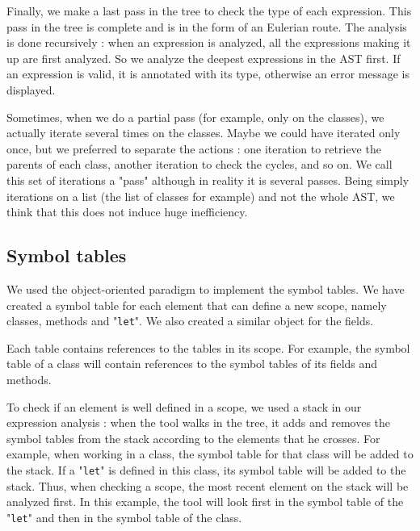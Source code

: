 \documentclass[a4paper, 12pt]{article}
\begin{document}
    Finally, we make a last pass in the tree to check the type of each expression. This pass in the tree is complete and is in the form of an Eulerian route. The analysis is done recursively : when an expression is analyzed, all the expressions making it up are first analyzed. So we analyze the deepest expressions in the AST first. If an expression is valid, it is annotated with its type, otherwise an error message is displayed.
    
    \begin{rmk}
        Sometimes, when we do a partial pass (for example, only on the classes), we actually iterate several times on the classes. Maybe we could have iterated only once, but we preferred to separate the actions : one iteration to retrieve the parents of each class, another iteration to check the cycles, and so on. We call this set of iterations a "pass" although in reality it is several passes. Being simply iterations on a list (the list of classes for example) and not the whole AST, we think that this does not induce huge inefficiency.
    \end{rmk}
    
    \subsection{Symbol tables}
    
    We used the object-oriented paradigm to implement the symbol tables. We have created a symbol table for each element that can define a new scope, namely classes, methods and "\texttt{let}". We also created a similar object for the fields.
    
    Each table contains references to the tables in its scope. For example, the symbol table of a class will contain references to the symbol tables of its fields and methods.
    
    To check if an element is well defined in a scope, we used a stack in our expression analysis : when the tool walks in the tree, it adds and removes the symbol tables from the stack according to the elements that he crosses. For example, when working in a class, the symbol table for that class will be added to the stack. If a "\texttt{let}" is defined in this class, its symbol table will be added to the stack. Thus, when checking a scope, the most recent element on the stack will be analyzed first. In this example, the tool will look first in the symbol table of the "\texttt{let}" and then in the symbol table of the class.
    
\end{document}
